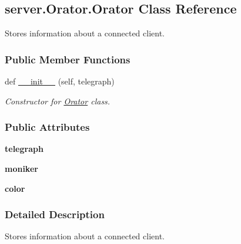 \hypertarget{classserver_1_1Orator_1_1Orator}{}\subsection{server.\+Orator.\+Orator Class Reference}
\label{classserver_1_1Orator_1_1Orator}


Stores information about a connected client.  


\subsubsection*{Public Member Functions}
\begin{DoxyCompactItemize}
\item 
def \hyperlink{classserver_1_1Orator_1_1Orator_a173c8497b251bba46514f28e089597eb}{\+\_\+\+\_\+init\+\_\+\+\_\+} (self, telegraph)
\begin{DoxyCompactList}\small\item\em Constructor for \hyperlink{classserver_1_1Orator_1_1Orator}{Orator} class. \end{DoxyCompactList}\end{DoxyCompactItemize}
\subsubsection*{Public Attributes}
\begin{DoxyCompactItemize}
\item 
{\bfseries telegraph}\hypertarget{classserver_1_1Orator_1_1Orator_a87ae5421efc0e5f4ccce21d04cb921f4}{}\label{classserver_1_1Orator_1_1Orator_a87ae5421efc0e5f4ccce21d04cb921f4}

\item 
{\bfseries moniker}\hypertarget{classserver_1_1Orator_1_1Orator_a153d7720e2e5f6b7c41c67333a1390ba}{}\label{classserver_1_1Orator_1_1Orator_a153d7720e2e5f6b7c41c67333a1390ba}

\item 
{\bfseries color}\hypertarget{classserver_1_1Orator_1_1Orator_a1a5fc663a1e5aaa7d58fbcf05829d882}{}\label{classserver_1_1Orator_1_1Orator_a1a5fc663a1e5aaa7d58fbcf05829d882}

\end{DoxyCompactItemize}


\subsubsection{Detailed Description}
Stores information about a connected client. 

